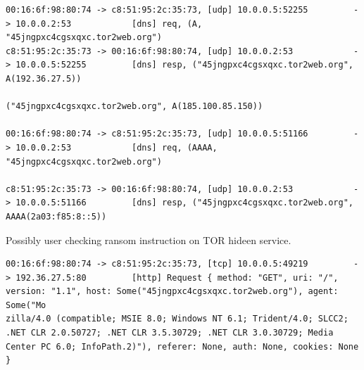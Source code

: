 \documentclass[11pt]{diazessay} %
\begin{document}
\begin{lstlisting}
00:16:6f:98:80:74 -> c8:51:95:2c:35:73, [udp] 10.0.0.5:52255         -> 10.0.0.2:53            [dns] req, (A, "45jngpxc4cgsxqxc.tor2web.org")
c8:51:95:2c:35:73 -> 00:16:6f:98:80:74, [udp] 10.0.0.2:53            -> 10.0.0.5:52255         [dns] resp, ("45jngpxc4cgsxqxc.tor2web.org", A(192.36.27.5))
                                                                                                           ("45jngpxc4cgsxqxc.tor2web.org", A(185.100.85.150))
																										   00:16:6f:98:80:74 -> c8:51:95:2c:35:73, [udp] 10.0.0.5:51166         -> 10.0.0.2:53            [dns] req, (AAAA, "45jngpxc4cgsxqxc.tor2web.org")
																										   c8:51:95:2c:35:73 -> 00:16:6f:98:80:74, [udp] 10.0.0.2:53            -> 10.0.0.5:51166         [dns] resp, ("45jngpxc4cgsxqxc.tor2web.org", AAAA(2a03:f85:8::5))
\end{lstlisting}

Possibly user checking ransom instruction on TOR hideen service.
\begin{lstlisting}
00:16:6f:98:80:74 -> c8:51:95:2c:35:73, [tcp] 10.0.0.5:49219         -> 192.36.27.5:80         [http] Request { method: "GET", uri: "/", version: "1.1", host: Some("45jngpxc4cgsxqxc.tor2web.org"), agent: Some("Mo
zilla/4.0 (compatible; MSIE 8.0; Windows NT 6.1; Trident/4.0; SLCC2; .NET CLR 2.0.50727; .NET CLR 3.5.30729; .NET CLR 3.0.30729; Media Center PC 6.0; InfoPath.2)"), referer: None, auth: None, cookies: None }
\end{lstlisting}
\end{document}
